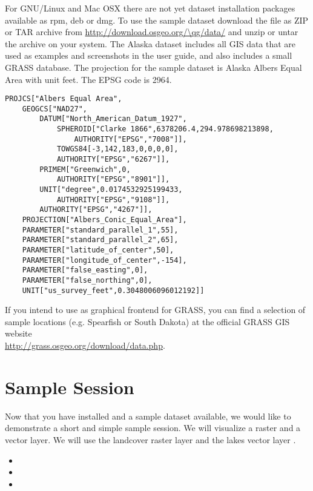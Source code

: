 \nix \osx For GNU/Linux and Mac OSX there are not yet dataset installation
packages available as rpm, deb or dmg. To use the sample dataset download the
file  as ZIP or TAR archive from
\url{http://download.osgeo.org/\qg/data/} and unzip or untar the archive on
your system. The Alaska dataset includes all GIS data that are used as
examples and screenshots in the user guide, and also includes a small GRASS
database. The projection for the \qg sample dataset is Alaska Albers Equal
Area with unit feet. The EPSG code is 2964.

\begin{verbatim}
PROJCS["Albers Equal Area",
    GEOGCS["NAD27",
        DATUM["North_American_Datum_1927",
            SPHEROID["Clarke 1866",6378206.4,294.978698213898,
                AUTHORITY["EPSG","7008"]],
            TOWGS84[-3,142,183,0,0,0,0],
            AUTHORITY["EPSG","6267"]],
        PRIMEM["Greenwich",0,
            AUTHORITY["EPSG","8901"]],
        UNIT["degree",0.0174532925199433,
            AUTHORITY["EPSG","9108"]],
        AUTHORITY["EPSG","4267"]],
    PROJECTION["Albers_Conic_Equal_Area"],
    PARAMETER["standard_parallel_1",55],
    PARAMETER["standard_parallel_2",65],
    PARAMETER["latitude_of_center",50],
    PARAMETER["longitude_of_center",-154],
    PARAMETER["false_easting",0],
    PARAMETER["false_northing",0],
    UNIT["us_survey_feet",0.3048006096012192]]
\end{verbatim}

If you intend to use \qg as graphical frontend for GRASS, you can find a
selection of sample locations (e.g. Spearfish or South Dakota) at the
official GRASS GIS website \\
\url{http://grass.osgeo.org/download/data.php}. 

\section{Sample Session}\label{samplesession}

Now that you have \qg installed and a sample dataset available, we would 
like to demonstrate a short and simple \qg sample session. We will visualize 
a raster and a vector layer. We will use the landcover raster 
layer  and the lakes 
vector layer .


\begin{itemize}[label=--]
\item {}
\item {}
\item {}
\end{itemize} 

